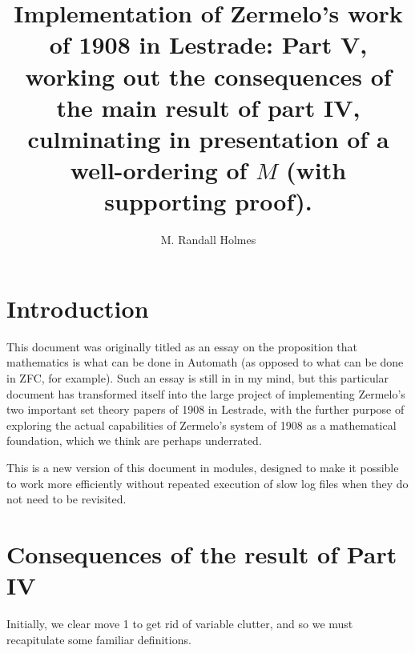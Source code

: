 \documentclass[12pt]{article}
\title{Implementation of Zermelo's work of 1908 in Lestrade:  Part V, working out the consequences of the main result of part IV, culminating in presentation of a well-ordering of $M$ (with supporting proof).}
\author{M. Randall Holmes}
\begin{document}
\maketitle

\section{Introduction}
 
This document was originally titled as an essay on the proposition that mathematics is what can be done in Automath (as opposed to what can be done in ZFC, for example).  Such an essay is still in in my mind, but this particular document has transformed itself into the large project of implementing Zermelo's two important set theory papers of 1908 in Lestrade, with the further purpose of exploring the actual capabilities of Zermelo's system of 1908 as a mathematical foundation, which we think are perhaps underrated.

This is a new version of this document in modules, designed to make it possible to work more efficiently without repeated execution of slow log files when they do not need to be revisited.

\section{Consequences of the result of Part IV}

Initially, we clear move 1 to get rid of variable clutter, and so we must recapitulate some familiar definitions.
\end{document}
